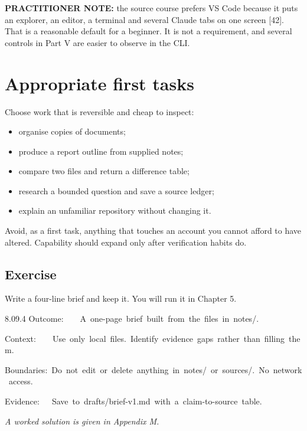 \documentclass[11pt,a4paper,twoside,openany]{book}
\newcommand{\cl}[1]{\noindent\mbox{#1}\par}
\begin{document}
\textbf{PRACTITIONER NOTE:} the source course prefers VS Code because it puts an explorer, an editor, a terminal and several Claude tabs on one screen [42]. That is a reasonable default for a beginner. It is not a requirement, and several controls in Part V are easier to observe in the CLI.


\FloatBarrier
\setcounter{section}{3}
\section{Appropriate first tasks}

Choose work that is reversible and cheap to inspect:


\begin{itemize}
\item organise copies of documents;
\item produce a report outline from supplied notes;
\item compare two files and return a difference table;
\item research a bounded question and save a source ledger;
\item explain an unfamiliar repository without changing it.
\end{itemize}

Avoid, as a first task, anything that touches an account you cannot afford to have altered. Capability should expand only after verification habits do.


\subsection*{Exercise}

Write a four-line brief and keep it. You will run it in Chapter 5.


\begin{codeblock}{8.0}{9.4}
\cl{Outcome:~~~~A~one-page~brief~built~from~the~files~in~notes/.}
\cl{Context:~~~~Use~only~local~files.~Identify~evidence~gaps~rather~than~filling~them.}
\cl{Boundaries:~Do~not~edit~or~delete~anything~in~notes/~or~sources/.~No~network~access.}
\cl{Evidence:~~~Save~to~drafts/brief-v1.md~with~a~claim-to-source~table.}
\end{codeblock}

\emph{A worked solution is given in Appendix M.}
\end{document}
